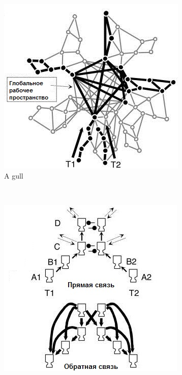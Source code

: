 \documentclass[a4paper,14pt]{report}
\begin{document}
	\renewcommand{\figurename}{Рисунок}
	\begin{figure}
		\centering
		\begin{subfigure}[b]{0.3\textwidth}
			\includegraphics[width=\textwidth]{dehaene_gwt_a}
			\caption{A gull}
			\label{fig:gull}
		\end{subfigure}%
		~ %
		\begin{subfigure}[b]{0.3\textwidth}
			\includegraphics[width=\textwidth]{dehaene_gwt_b}

\end{subfigure}
\end{figure}
\end{document}
